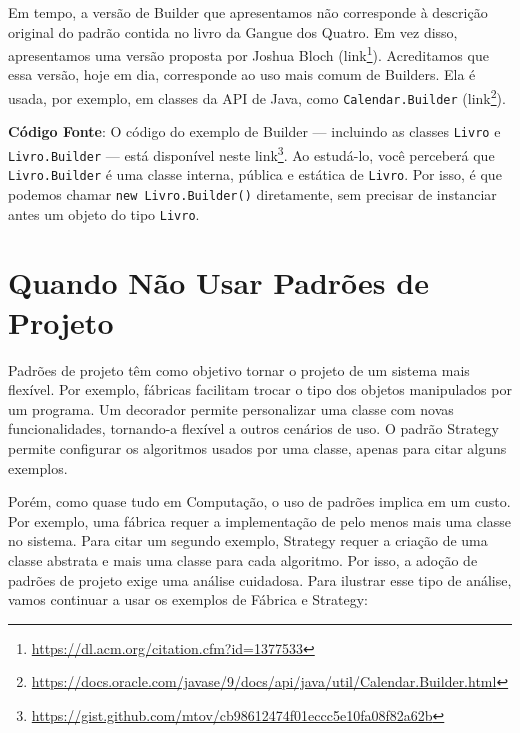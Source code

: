 \documentclass[
  11pt,
  twoside]{book}
\newcommand{\passthrough}[1]{#1}
\DeclareRobustCommand{\href}[2]{#2\footnote{\url{#1}}}
\begin{document}
Em tempo, a versão de Builder que apresentamos não corresponde à
descrição original do padrão contida no livro da Gangue dos Quatro. Em
vez disso, apresentamos uma versão proposta por Joshua Bloch
(\href{https://dl.acm.org/citation.cfm?id=1377533}{link}). Acreditamos
que essa versão, hoje em dia, corresponde ao uso mais comum de Builders.
Ela é usada, por exemplo, em classes da API de Java, como
\passthrough{\lstinline!Calendar.Builder!}
(\href{https://docs.oracle.com/javase/9/docs/api/java/util/Calendar.Builder.html}{link}).

\textbf{Código Fonte}: O código do exemplo de Builder --- incluindo as
classes \passthrough{\lstinline!Livro!} e
\passthrough{\lstinline!Livro.Builder!} --- está disponível neste
\href{https://gist.github.com/mtov/cb98612474f01eccc5e10fa08f82a62b}{link}.
Ao estudá-lo, você perceberá que \passthrough{\lstinline!Livro.Builder!}
é uma classe interna, pública e estática de
\passthrough{\lstinline!Livro!}. Por isso, é que podemos chamar
\passthrough{\lstinline!new Livro.Builder()!} diretamente, sem precisar
de instanciar antes um objeto do tipo \passthrough{\lstinline!Livro!}.

\hypertarget{quando-nuxe3o-usar-padruxf5es-de-projeto}{%
\section{Quando Não Usar Padrões de
Projeto}\label{quando-nuxe3o-usar-padruxf5es-de-projeto}}

Padrões de projeto têm como objetivo tornar o projeto de um sistema mais
flexível. Por exemplo, fábricas facilitam trocar o tipo dos objetos
manipulados por um programa. Um decorador permite personalizar uma
classe com novas funcionalidades, tornando-a flexível a outros cenários
de uso. O padrão Strategy permite configurar os algoritmos usados por
uma classe, apenas para citar alguns exemplos.

Porém, como quase tudo em Computação, o uso de padrões implica em um
custo. Por exemplo, uma fábrica requer a implementação de pelo menos
mais uma classe no sistema. Para citar um segundo exemplo, Strategy
requer a criação de uma classe abstrata e mais uma classe para cada
algoritmo. Por isso, a adoção de padrões de projeto exige uma análise
cuidadosa. Para ilustrar esse tipo de análise, vamos continuar a usar os
exemplos de Fábrica e Strategy:
\end{document}
